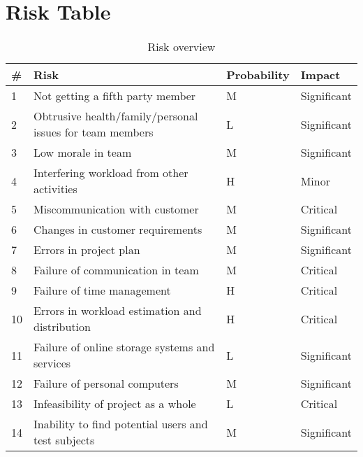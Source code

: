 \chapter{Risk Table}
\label{chap:risktable}

\begin{table}
\begin{tabularx}{\textwidth}{ | l | X | l | l | }
  \hline
  \textbf{\#} & \textbf{Risk} & \textbf{Probability} & \textbf{Impact} \\ \hline
  1 & Not getting a fifth party member & M & Significant \\ \hline
  2 & Obtrusive health/family/personal issues for team members & L & Significant \\ \hline
  3 & Low morale in team & M & Significant \\ \hline
  4 & Interfering workload from other activities & H & Minor \\ \hline
  5 & Miscommunication with customer & M & Critical \\ \hline
  6 & Changes in customer requirements & M & Significant \\ \hline
  7 & Errors in project plan & M & Significant \\ \hline
  8 & Failure of communication in team & M & Critical \\ \hline
  9 & Failure of time management & H & Critical \\ \hline
 10 & Errors in workload estimation and distribution & H & Critical \\ \hline
 11 & Failure of online storage systems and services & L & Significant \\ \hline
 12 & Failure of personal computers & M & Significant \\ \hline
 13 & Infeasibility of project as a whole & L & Critical \\ \hline
 14 & Inability to find potential users and test subjects & M & Significant \\ \hline
\end{tabularx}
\caption{Risk overview}
\end{table}


